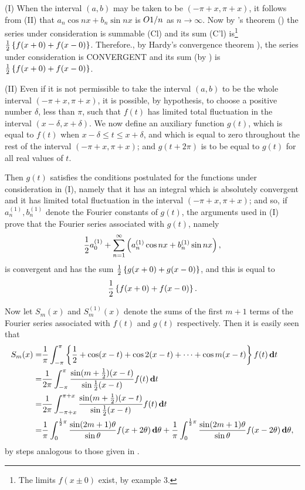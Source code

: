 (I) When the interval $(a, b)$ may be taken to be $(-\pi + x, \pi + x)$,
it follows from  (II) %
that $a_{n} \cos nx + b_{n} \sin nx$ is $O{1/n}$ as
$n \rightarrow \infty$. Now by \Fejer's theorem ()
the series under consideration
is summable (Cl) %
and its sum (C'l) %
is\footnote{The limits $f(x \pm 0)$ exist, by  example 3.%
}
$\frac{1}{2} \left\{ f(x+0) + f(x-0) \right\}$. Therefore.,
by Hardy's convergence theorem ), the series under consideration
is CONVERGENT %
and its sum (by ) is
$\frac{1}{2} \left\{ f(x+0) + f(x-0) \right\}$.

(II) %
Even if it is not permissible to take the interval $(a, b)$ to be
the whole interval $(-\pi + x, \pi + x)$, it is possible, by
hypothesis, to choose a positive number $\delta$, less than $\pi$,
such that $f(t)$
has limited total fluctuation in the interval $(x-\delta, x+\delta)$.
We now define an auxiliary function $g(t)$, which is equal to $f(t)$ when
$x - \delta \leq t \leq x + \delta$,
and which is equal to zero throughout the rest of the interval
$(-\pi + x, \pi + x)$; and $g(t + 2\pi)$ is to be equal to $g(t)$ for all real
values of $t$.

Then $g(t)$ satisfies the conditions postulated for the functions under
consideration in (I),%
namely that it has an integral which is
absolutely convergent and it has limited total fluctuation in the
interval $(-\pi + x, \pi + x)$; and so, if
$a_{n}^{(1)}, b_{n}^{(1)}$ denote the Fourier
constants of $g(t)$, the arguments used in (I) %
prove that the Fourier
series associated with $g(t)$, namely
$$
\frac{1}{2} a_{0}^{(1)}
+
\sum_{n=1}^{\infty}
\left( 
  a_{n}^{(1)} \cos nx
  +
  b_{n}^{(1)} \sin nx
 \right),
$$
is convergent and has the sum
$\frac{1}{2} \left\{ g(x+0) + g(x-0) \right\}$, and this is
equal to
$$
\frac{1}{2} \left\{ 
  f(x+0) + f(x-0)
 \right\}.
$$
%
%

Now let $S_{m}(x)$ and $S_{m}^{(1)} (x)$ denote the sums of the first $m + 1$
terms of the Fourier series associated with $f(t)$ and $g(t)$ respectively. Then
it is easily seen that
\begin{align*}
  S_{m}(x)
  =&
  \frac{1}{\pi}
  \int_{-\pi}^{\pi} \left\{ 
    \frac{1}{2}
    + \cos (x-t)
    + \cos 2(x-t)
    + \cdots
    + \cos m(x-t)
   \right\}
  f(t) \, \mathbf{d} t
  \\
  =&
  \frac{1}{2\pi}
  \int_{-\pi}^{\pi}
  \frac{\sin (m+\frac{1}{2}) (x-t) }{\sin \frac{1}{2} (x-t)}
  f(t) \, \mathbf{d} t
  \\
  =&
  \frac{1}{2\pi}
  \int_{-\pi+x}^{\pi+x}
  \frac{\sin (m+\frac{1}{2}) (x-t) }{\sin \frac{1}{2} (x-t)}
  f(t) \, \mathbf{d} t
  \\
  =&
  \frac{1}{\pi}
  \int_{0}^{\frac{1}{2} \pi}
  \frac{\sin (2m+1)\theta}{\sin \theta}
  f(x + 2\theta) \, \mathbf{d} \theta
  +
  \frac{1}{\pi}
  \int_{0}^{\frac{1}{2} \pi}
  \frac{\sin (2m+1)\theta}{\sin \theta}
  f(x - 2\theta) \, \mathbf{d} \theta,
\end{align*}
by steps analogous to those given in .

